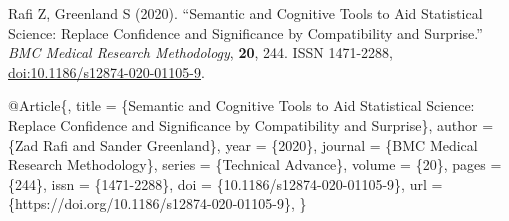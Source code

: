 \documentclass[
]{article}
\newenvironment{Shaded}{\begin{snugshade}}{\end{snugshade}}
\newcommand{\DataTypeTok}[1]{\textcolor[rgb]{0.13,0.29,0.53}{#1}}
\newcommand{\NormalTok}[1]{#1}
\newcommand{\VariableTok}[1]{\textcolor[rgb]{0.00,0.00,0.00}{#1}}
\begin{document}
Rafi Z, Greenland S (2020). ``Semantic and Cognitive Tools to Aid
Statistical Science: Replace Confidence and Significance by
Compatibility and Surprise.'' \emph{BMC Medical Research Methodology},
\textbf{20}, 244. ISSN 1471-2288,
\href{https://doi.org/10.1186/s12874-020-01105-9}{doi:10.1186/s12874-020-01105-9}.

\begin{Shaded}
\begin{Highlighting}[]
\VariableTok{@Article}\NormalTok{\{,}
  \DataTypeTok{title}\NormalTok{ = \{Semantic and Cognitive Tools to Aid Statistical Science: Replace Confidence and Significance by Compatibility and Surprise\},}
  \DataTypeTok{author}\NormalTok{ = \{Zad Rafi and Sander Greenland\},}
  \DataTypeTok{year}\NormalTok{ = \{2020\},}
  \DataTypeTok{journal}\NormalTok{ = \{BMC Medical Research Methodology\},}
  \DataTypeTok{series}\NormalTok{ = \{Technical Advance\},}
  \DataTypeTok{volume}\NormalTok{ = \{20\},}
  \DataTypeTok{pages}\NormalTok{ = \{244\},}
  \DataTypeTok{issn}\NormalTok{ = \{1471{-}2288\},}
  \DataTypeTok{doi}\NormalTok{ = \{10.1186/s12874{-}020{-}01105{-}9\},}
  \DataTypeTok{url}\NormalTok{ = \{https://doi.org/10.1186/s12874{-}020{-}01105{-}9\},}
\NormalTok{\}}
\end{Highlighting}
\end{Shaded}
\end{document}
